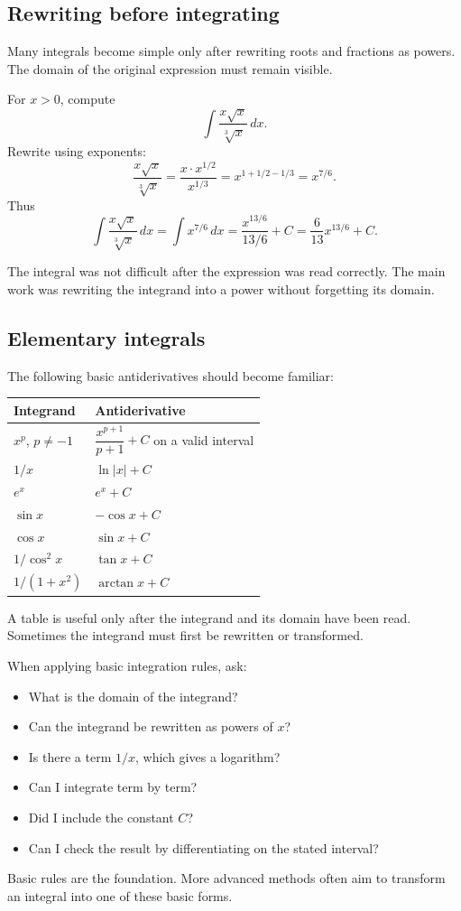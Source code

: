 \subsection*{Rewriting before integrating}

Many integrals become simple only after rewriting roots and fractions as powers. The domain of the original expression must remain visible.

\begin{examplebox}
For \(x>0\), compute
\[
\int \frac{x\sqrt{x}}{\sqrt[3]{x}}\,dx.
\]
Rewrite using exponents:
\[
\frac{x\sqrt{x}}{\sqrt[3]{x}}
=\frac{x\cdot x^{1/2}}{x^{1/3}}
=x^{1+1/2-1/3}=x^{7/6}.
\]
Thus
\[
\int \frac{x\sqrt{x}}{\sqrt[3]{x}}\,dx
=\int x^{7/6}\,dx
=\frac{x^{13/6}}{13/6}+C
=\frac6{13}x^{13/6}+C.
\]
\end{examplebox}

The integral was not difficult after the expression was read correctly. The main work was rewriting the integrand into a power without forgetting its domain.

\subsection*{Elementary integrals}

The following basic antiderivatives should become familiar:

\begin{center}
\begin{tabular}{ll}
\toprule
Integrand & Antiderivative \\
\midrule
\(x^p\), \(p\ne -1\) & \(\dfrac{x^{p+1}}{p+1}+C\) on a valid interval \\
\(1/x\) & \(\ln|x|+C\) \\
\(e^x\) & \(e^x+C\) \\
\(\sin x\) & \(-\cos x+C\) \\
\(\cos x\) & \(\sin x+C\) \\
\(1/\cos^2 x\) & \(\tan x+C\) \\
\(1/(1+x^2)\) & \(\arctan x+C\) \\
\bottomrule
\end{tabular}
\end{center}

A table is useful only after the integrand and its domain have been read. Sometimes the integrand must first be rewritten or transformed.

\begin{summarybox}
When applying basic integration rules, ask:
\begin{itemize}
\item What is the domain of the integrand?
\item Can the integrand be rewritten as powers of \(x\)?
\item Is there a term \(1/x\), which gives a logarithm?
\item Can I integrate term by term?
\item Did I include the constant \(C\)?
\item Can I check the result by differentiating on the stated interval?
\end{itemize}
\end{summarybox}

Basic rules are the foundation. More advanced methods often aim to transform an integral into one of these basic forms.
